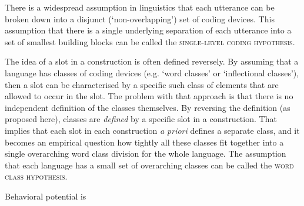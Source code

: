 There is a widespread assumption in linguistics that each utterance can be broken down into a disjunct (`non-overlapping') set of coding devices. This assumption that there is a single underlying separation of each utterance into a set of smallest building blocks can be called the \textsc{single-level coding hypothesis}.

%
The idea of a slot in a construction is often defined reversely. By assuming that a language has classes of coding devices (e.g. `word classes' or `inflectional classes'), then a slot can be characterised by a specific such class of elements that are allowed to occur in the slot. The problem with that approach is that there is no independent definition of the classes themselves. By reversing the definition (as proposed here), classes are \emph{defined} by a specific slot in a construction. That implies that each slot in each construction \emph{a priori} defines a separate class, and it becomes an empirical question how tightly all these classes fit together into a single overarching word class division for the whole language. The assumption that each language has a small set of overarching classes can be called the \textsc{word class hypothesis}.

%
Behavioral potential is 

